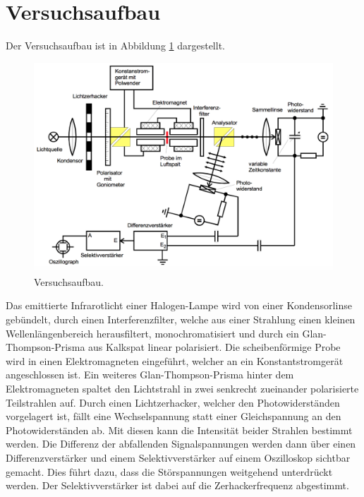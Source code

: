 \section{Versuchsaufbau}
Der Versuchsaufbau ist in Abbildung \ref{fig:aufbau} dargestellt.
\begin{figure}
    \centering
    \includegraphics[scale = 0.4]{aufbau.png}
    \caption{Versuchsaufbau.\cite{1}}
    \label{fig:aufbau}
  \end{figure}
 \newline
Das emittierte Infrarotlicht einer Halogen-Lampe wird von einer Kondensorlinse gebündelt,
durch einen Interferenzfilter, welche aus einer Strahlung einen kleinen Wellenlängenbereich herausfiltert,
monochromatisiert und durch ein Glan-Thompson-Prisma aus Kalkspat linear polarisiert.
Die scheibenförmige Probe wird in einen Elektromagneten eingeführt, welcher an ein Konstantstromgerät
angeschlossen ist. Ein weiteres Glan-Thompson-Prisma hinter dem Elektromagneten spaltet den Lichtstrahl
in zwei senkrecht zueinander polarisierte Teilstrahlen auf. Durch einen Lichtzerhacker, welcher den Photowiderständen
vorgelagert ist, fällt eine Wechselspannung statt einer Gleichspannung an den Photowiderständen ab.
Mit diesen kann die Intensität beider Strahlen bestimmt werden.
Die Differenz der abfallenden Signalspannungen werden dann über einen Differenzverstärker und einem
Selektivverstärker auf einem Oszilloskop sichtbar gemacht. Dies führt dazu, dass die Störspannungen
weitgehend unterdrückt werden. Der Selektivverstärker ist dabei auf die Zerhackerfrequenz abgestimmt.
